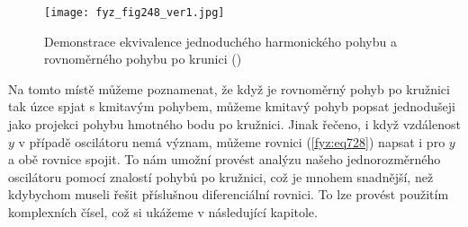    \begin{figure}[ht!] %
      \centering
      \texttt{[image: fyz\_fig248\_ver1.jpg]}
      \caption{Demonstrace ekvivalence jednoduchého harmonického pohybu a rovnoměrného pohybu po 
              krunici
              (\cite[s.~290]{Feynman01})}
      \label{fyz:fig248}
    \end{figure}

    Na tomto místě můžeme poznamenat, že když je rovnoměrný pohyb po kružnici tak úzce spjat s
    kmitavým pohybem, můžeme kmitavý pohyb popsat jednodušeji jako projekci pohybu hmotného bodu po
    kružnici. Jinak řečeno, i když vzdálenost \(y\) v případě oscilátoru nemá význam, můžeme rovnici
    (\ref{fyz:eq728}) napsat i pro \(y\) a obě rovnice spojit. To nám umožní provést analýzu našeho
    jednorozměrného oscilátoru pomocí znalostí pohybů po kružnici, což je mnohem snadnější, než
    kdybychom museli řešit příslušnou diferenciální rovnici. To lze provést použitím komplexních
    čísel, což si ukážeme v následující kapitole.

